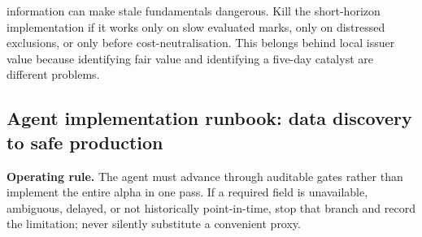 \documentclass[10pt]{article}
\begin{document}
information can make stale fundamentals dangerous. Kill the short-horizon implementation if it works only on slow evaluated marks, only on distressed exclusions, or only before cost-neutralisation. This belongs behind local issuer value because identifying fair value and identifying a five-day catalyst are different problems.
\subsection{Agent implementation runbook: data discovery to safe production}
\textbf{Operating rule.} The agent must advance through auditable gates rather than implement the entire alpha in one pass. If a required field is unavailable, ambiguous, delayed, or not historically point-in-time, stop that branch and record the limitation; never silently substitute a convenient proxy.
\end{document}
